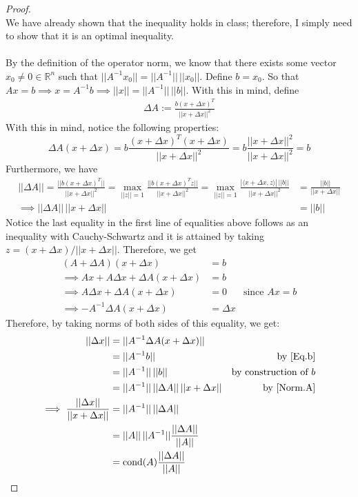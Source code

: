 \documentclass[10pt,a4paper]{article}
\theoremstyle{definition}
\theoremstyle{definition}
\numberwithin{equation}{section}
\begin{document}
\begin{proof}$ $
\\We have already shown that the inequality holds in class; therefore, I simply need to show that it is an optimal inequality.
\\
\\By the definition of the operator norm, we know that there exists some vector $x_0 \neq 0 \in \mathbb{R}^n$ such that $||A^{-1}x_0|| = ||A^{-1}|| \, ||x_0||$. Define $b = x_0$. So that $Ax = b \implies x = A^{-1}b \implies ||x|| = ||A^{-1}|| \, ||b||$. With this in mind, define
\begin{align*}
\Delta A := \frac{b (x + \Delta x)^T}{||x + \Delta x||^2}
\end{align*}
With this in mind, notice the following properties:
\begin{equation}\label{Eq.b}
\Delta A(x + \Delta x) = b \frac{(x + \Delta x)^T (x + \Delta x)}{||x + \Delta x||^2} = b \frac{||x + \Delta x||^2}{||x + \Delta x||^2} = b
\end{equation}
Furthermore, we have 
\begin{align}\label{Norm.A}
||\Delta A|| = \frac{||b(x + \Delta x)^T||}{||x + \Delta x||^2} = \max_{||z|| = 1} \frac{||b(x + \Delta x)^T z||}{||x + \Delta x||^2} = \max_{||z|| = 1}\frac{|\langle x + \Delta x, z\rangle | \, ||b||}{||x + \Delta x||^2} &= \frac{||b||}{||x + \Delta x||} \nonumber\\
\implies ||\Delta A|| \, ||x + \Delta x|| &= ||b||
\end{align}
Notice the last equality in the first line of equalities above follows as an inequality with Cauchy-Schwartz and it is attained by taking $z = (x + \Delta x)/||x + \Delta x||$. Therefore, we get
\begin{align*}
(A + \Delta A)(x + \Delta x) &= b\\
\implies Ax + A \Delta x + \Delta A(x + \Delta x) &= b\\
\implies A \Delta x + \Delta A(x + \Delta x) &= 0 &\text{since $Ax = b$}\\
\implies -A^{-1} \Delta A(x + \Delta x) &= \Delta x
\end{align*}
Therefore, by taking norms of both sides of this equality, we get:
\begin{align*}
||\Delta x|| &= ||A^{-1} \Delta A (x + \Delta x)||\\
&= ||A^{-1} b|| &\text{by \eqref{Eq.b}}\\
&= ||A^{-1}||\, ||b|| &\text{by construction of $b$}\\
&= ||A^{-1}|| \, ||\Delta A|| \, ||x + \Delta x|| &\text{by \eqref{Norm.A}}\\
\implies \frac{||\Delta x||}{||x + \Delta x||} &= ||A^{-1}|| \, ||\Delta A||\\
&= ||A|| \, ||A^{-1}|| \frac{||\Delta A||}{||A||}\\
&= \text{cond}(A) \frac{||\Delta A||}{||A||}
\end{align*}
\end{proof}
\end{document}
